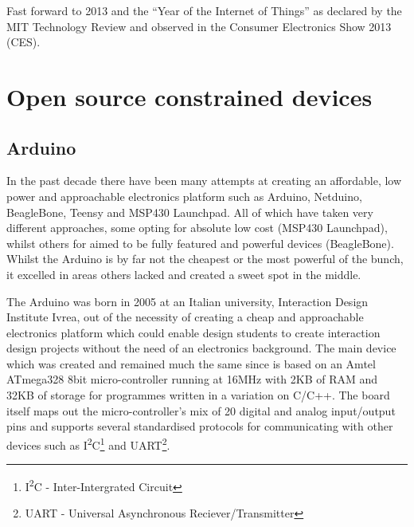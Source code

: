 \documentclass{l4proj}
\begin{document}
Fast forward to 2013 and the ``Year of the Internet of Things'' as declared by the MIT Technology Review\cite{2013IoT} and observed in the Consumer Electronics Show 2013 (CES).




\newpage
\section{Open source constrained devices} %
\label{sec:open_source_constrained_devices}

\subsection{Arduino} %
\label{sub:arduino}
In the past decade there have been many attempts at creating an affordable, low power and approachable electronics platform such as Arduino, Netduino, BeagleBone, Teensy and MSP430 Launchpad. All of which have taken very different approaches, some opting for absolute low cost (MSP430 Launchpad), whilst others for aimed to be fully featured and powerful devices (BeagleBone). Whilst the Arduino is by far not the cheapest or the most powerful of the bunch, it excelled in areas others lacked and created a sweet spot in the middle.

The Arduino was born in 2005 at an Italian university, Interaction Design Institute Ivrea, out of the necessity of creating a cheap and approachable electronics platform which could enable design students to create interaction design projects without the need of an electronics background.
The main device which was created and remained much the same since is based on an Amtel ATmega328 8bit micro-controller running at 16MHz with 2KB of RAM and 32KB of storage for programmes written in a variation on C/C++. The board itself maps out the micro-controller's mix of 20 digital and analog input/output pins and supports several standardised protocols for communicating with other devices such as I\textsuperscript{2}C\footnote{I\textsuperscript{2}C - Inter-Intergrated Circuit} and UART\footnote{UART - Universal Asynchronous Reciever/Transmitter}. 
\end{document}
